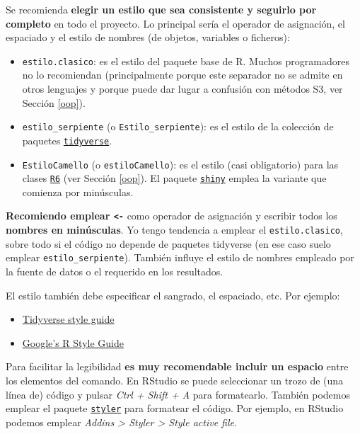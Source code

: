 \documentclass[
]{book}
\theoremstyle{break}
\theoremstyle{nonumberplain}
\begin{document}
Se recomienda \textbf{elegir un estilo que sea consistente y seguirlo por completo} en todo el proyecto.
Lo principal sería el operador de asignación, el espaciado y el estilo de nombres (de objetos, variables o ficheros):

\begin{itemize}
\item
  \texttt{estilo.clasico}: es el estilo del paquete base de R. Muchos programadores no lo recomiendan (principalmente porque este separador no se admite en otros lenguajes y porque puede dar lugar a confusión con métodos S3, ver Sección \ref{oop}).
\item
  \texttt{estilo\_serpiente} (o \texttt{Estilo\_serpiente}): es el estilo de la colección de paquetes \href{https://tidyverse.tidyverse.org}{\texttt{tidyverse}}.
\item
  \texttt{EstiloCamello} (o \texttt{estiloCamello}): es el estilo (casi obligatorio) para las clases \href{https://r6.r-lib.org}{\texttt{R6}} (ver Sección \ref{oop}). El paquete \href{https://shiny.rstudio.com/}{\texttt{shiny}} emplea la variante que comienza por minúsculas.
\end{itemize}

\textbf{Recomiendo emplear \texttt{\textless{}-}} como operador de asignación y escribir todos los \textbf{nombres en minúsculas}.
Yo tengo tendencia a emplear el \texttt{estilo.clasico}, sobre todo si el código no depende de paquetes tidyverse (en ese caso suelo emplear \texttt{estilo\_serpiente}).
También influye el estilo de nombres empleado por la fuente de datos o el requerido en los resultados.

El estilo también debe especificar el sangrado, el espaciado, etc.
Por ejemplo:

\begin{itemize}
\item
  \href{https://style.tidyverse.org}{Tidyverse style guide}
\item
  \href{https://google.github.io/styleguide/Rguide.html}{Google's R Style Guide}
\end{itemize}

Para facilitar la legibilidad \textbf{es muy recomendable incluir un espacio} entre los elementos del comando.
En RStudio se puede seleccionar un trozo de (una línea de) código y pulsar \emph{Ctrl + Shift + A} para formatearlo.
También podemos emplear el paquete \href{https://github.com/r-lib/styler}{\texttt{styler}} para formatear el código.
Por ejemplo, en RStudio podemos emplear \emph{Addins \textgreater{} Styler \textgreater{} Style active file}.
\end{document}
